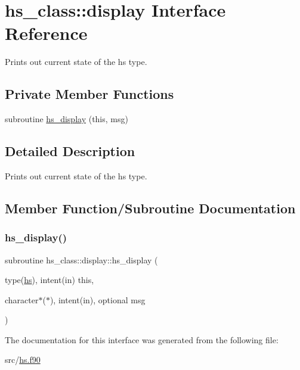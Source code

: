 \hypertarget{interfacehs__class_1_1display}{}\section{hs\+\_\+class\+:\+:display Interface Reference}
\label{interfacehs__class_1_1display}


Prints out current state of the hs type.  


\subsection*{Private Member Functions}
\begin{DoxyCompactItemize}
\item 
subroutine \hyperlink{interfacehs__class_1_1display_a6f6551ea4371aca98c85f1f83600a422}{hs\+\_\+display} (this, msg)
\end{DoxyCompactItemize}


\subsection{Detailed Description}
Prints out current state of the hs type. 

\subsection{Member Function/\+Subroutine Documentation}
\mbox{\label{interfacehs__class_1_1display_a6f6551ea4371aca98c85f1f83600a422}} 
\subsubsection{\texorpdfstring{hs\+\_\+display()}{hs\_display()}}
{\footnotesize\ttfamily subroutine hs\+\_\+class\+::display\+::hs\+\_\+display (\begin{DoxyParamCaption}\item[{type(\hyperlink{strucths__class_1_1hs}{hs}), intent(in)}]{this,  }\item[{character$\ast$($\ast$), intent(in), optional}]{msg }\end{DoxyParamCaption})\hspace{0.3cm}{\ttfamily [private]}}



The documentation for this interface was generated from the following file\+:\begin{DoxyCompactItemize}
\item 
src/\hyperlink{hs_8f90}{hs.\+f90}\end{DoxyCompactItemize}
